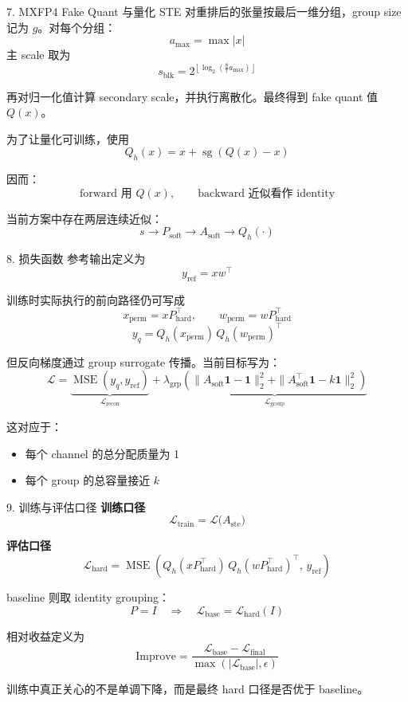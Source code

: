 \documentclass[aspectratio=169,professionalfonts]{ctexbeamer}
\newcommand{\Loss}{\mathcal{L}}
\newcommand{\Stop}{\operatorname{sg}}
\newcommand{\MSE}{\operatorname{MSE}}
\begin{document}
\begin{frame}{7. MXFP4 Fake Quant 与量化 STE}
  对重排后的张量按最后一维分组，group size 记为 $g$。对每个分组：
  \[
    a_{\max} = \max |x|
  \]
  主 scale 取为
  \[
    s_{\mathrm{blk}} = 2^{\left\lfloor \log_2\left(\frac{8}{7} a_{\max}\right) \right\rfloor}
  \]

  再对归一化值计算 secondary scale，并执行离散化。最终得到 fake quant 值 $Q(x)$。

  \vspace{0.4em}
  为了让量化可训练，使用
  \[
    Q_h(x) = x + \Stop(Q(x)-x)
  \]

  因而：
  \[
    \text{forward 用 } Q(x),\qquad
    \text{backward 近似看作 identity}
  \]

  当前方案中存在两层连续近似：
  \[
    s \rightarrow P_{\mathrm{soft}} \rightarrow A_{\mathrm{soft}} \rightarrow Q_h(\cdot)
  \]
\end{frame}

\begin{frame}{8. 损失函数}
  参考输出定义为
  \[
    y_{\mathrm{ref}} = xw^\top
  \]

  训练时实际执行的前向路径仍可写成
  \[
    x_{\mathrm{perm}} = xP_{\mathrm{hard}}^\top,\qquad
    w_{\mathrm{perm}} = wP_{\mathrm{hard}}^\top
  \]
  \[
    y_q = Q_h(x_{\mathrm{perm}})\,Q_h(w_{\mathrm{perm}})^\top
  \]

  但反向梯度通过 group surrogate 传播。当前目标写为：
  \[
    \Loss
    = \underbrace{\MSE(y_q, y_{\mathrm{ref}})}_{\Loss_{\mathrm{recon}}}
    + \lambda_{\mathrm{grp}}
    \underbrace{\left(
      \|A_{\mathrm{soft}}\mathbf{1}-\mathbf{1}\|_2^2
      +
      \|A_{\mathrm{soft}}^\top\mathbf{1}-k\mathbf{1}\|_2^2
    \right)}_{\Loss_{\mathrm{group}}}
  \]

  这对应于：
  \begin{itemize}
    \item 每个 channel 的总分配质量为 1
    \item 每个 group 的总容量接近 $k$
  \end{itemize}
\end{frame}

\begin{frame}{9. 训练与评估口径}
  \textbf{训练口径}
  \[
    \Loss_{\mathrm{train}}
    = \Loss\bigl(A_{\mathrm{ste}}\bigr)
  \]

  \textbf{评估口径}
  \[
    \Loss_{\mathrm{hard}}
    = \MSE\!\left(
      Q_h(xP_{\mathrm{hard}}^\top)\,Q_h(wP_{\mathrm{hard}}^\top)^\top,\,
      y_{\mathrm{ref}}
    \right)
  \]

  \vspace{0.4em}
  baseline 则取 identity grouping：
  \[
    P = I
    \quad \Longrightarrow \quad
    \Loss_{\mathrm{base}} = \Loss_{\mathrm{hard}}(I)
  \]

  相对收益定义为
  \[
    \mathrm{Improve}
    = \frac{\Loss_{\mathrm{base}}-\Loss_{\mathrm{final}}}
    {\max(|\Loss_{\mathrm{base}}|,\epsilon)}
  \]

  \vspace{0.4em}
  训练中真正关心的不是单调下降，而是最终 hard 口径是否优于 baseline。
\end{frame}
\end{document}
